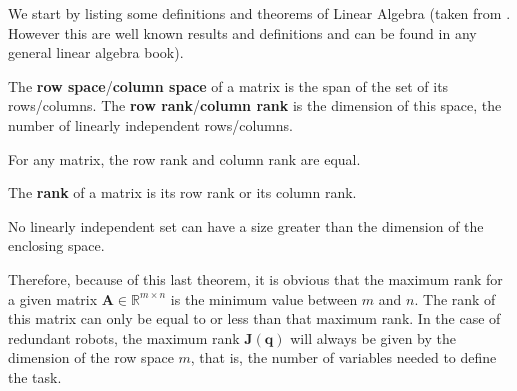We start by listing some definitions and theorems of Linear Algebra (taken from \cite{hefferonlinear}. However this are well known results and definitions and can be found in any general linear algebra book).



\begin{definition}
The \textbf{row space}/\textbf{column space} of a matrix is the span of the set of its rows/columns. The \textbf{row rank}/\textbf{column rank} is the dimension of this space, the number of linearly independent rows/columns.
\end{definition}

\begin{theorem}
For any matrix, the row rank and column rank are equal.
\end{theorem}

\begin{definition}
The \textbf{rank} of a matrix is its row rank or its column rank.
\end{definition}

\begin{theorem}
No linearly independent set can have a size greater than the dimension of the enclosing space.
\end{theorem}

Therefore, because of this last theorem, it is obvious that the maximum rank for a given matrix $\mathbf{A} \in \mathbb{R}^{m \times n} $ is the minimum value between $m$ and $n$. The rank of this matrix can only be equal to or less than that maximum rank. In the case of redundant robots, the maximum rank ${\mathbf{J}(\mathbf{{q}})}$ will always be given by the dimension of the row space $m$, that is, the number of variables needed to define the task.


